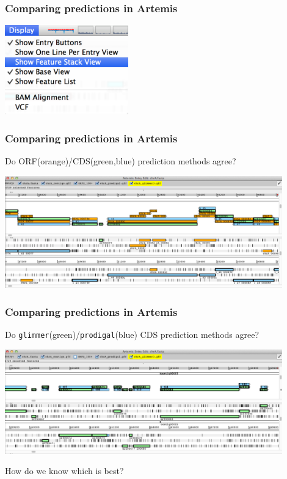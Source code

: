 \documentclass[table]{beamer}
\begin{document}
    \begin{frame}
     \frametitle{Comparing predictions in Artemis}
      \begin{center}
        \includegraphics[width=0.4\textwidth]{images/artemis_cdspred2}     
      \end{center}
    \end{frame}

    \begin{frame}
     \frametitle{Comparing predictions in Artemis}
     Do ORF(orange)/CDS(green,blue) prediction methods agree?
      \begin{center}
        \includegraphics[width=0.9\textwidth]{images/artemis_cdspred3}     
      \end{center}
    \end{frame}

    \begin{frame}
     \frametitle{Comparing predictions in Artemis}
     Do \texttt{glimmer}(green)/\texttt{prodigal}(blue) CDS prediction methods agree?
      \begin{center}
        \includegraphics[width=0.9\textwidth]{images/artemis_cdspred4}     
      \end{center}
      How do we know which is best?
    \end{frame}
\end{document}
